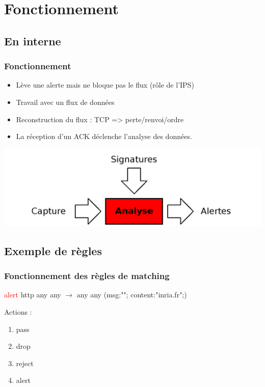\documentclass{beamer}
\begin{document}
\section{Fonctionnement}
\subsection{En interne}
\begin{frame}
\frametitle{Fonctionnement}
\begin{itemize}
[triangle]
\item Lève une alerte mais ne bloque pas le flux (rôle de l'IPS)
\item Travail avec un flux de données
\item Reconstruction du flux : TCP => perte/renvoi/ordre
\item La réception d'un ACK déclenche l'analyse des données.
\end{itemize}
\begin{center}
\includegraphics[scale=0.15]{img/matching.png}
\end{center}
\end{frame}

\subsection{Exemple de règles}
\begin{frame}
\frametitle{Fonctionnement des règles de matching}
\begin{block}{}
\textcolor{red}{alert} http any any $\rightarrow$ any any (msg:""; content:"inria.fr";)
\end{block}
Actions :
\begin{enumerate}
\item pass
\item drop
\item reject
\item alert
\end{enumerate}
\end{frame}
\end{document}
